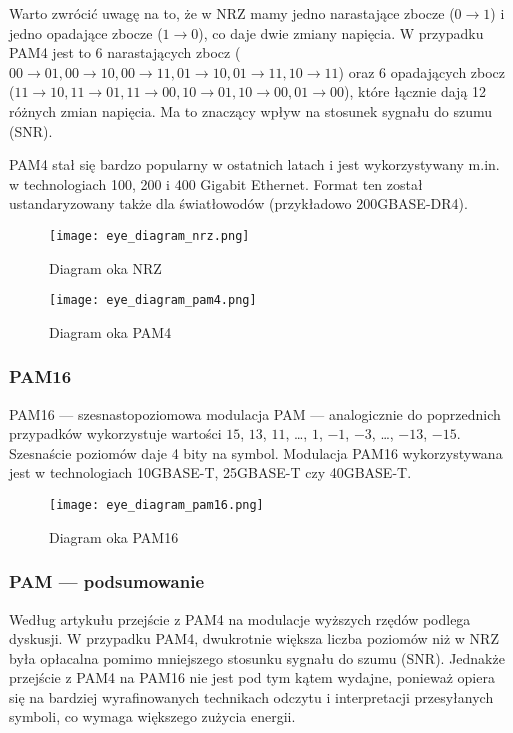 Warto zwrócić uwagę na to, że w NRZ mamy jedno narastające zbocze ($0 \rightarrow 1$) i jedno opadające zbocze ($1 \rightarrow 0$), co daje dwie zmiany napięcia. W przypadku PAM4 jest to 6 narastających zbocz
($00 \rightarrow 01, 00 \rightarrow 10, 00 \rightarrow 11, 01 \rightarrow 10, 01 \rightarrow 11, 10 \rightarrow 11$) oraz 6 opadających zbocz
($11 \rightarrow 10, 11 \rightarrow 01, 11 \rightarrow 00, 10 \rightarrow 01, 10 \rightarrow 00, 01 \rightarrow 00$), które łącznie dają 12 różnych zmian napięcia.
Ma to znaczący wpływ na stosunek sygnału do szumu (SNR).

PAM4 stał się bardzo popularny w ostatnich latach i jest wykorzystywany m.in. w technologiach 100, 200 i 400 Gigabit Ethernet. Format ten został ustandaryzowany
także dla światłowodów (przykładowo 200GBASE-DR4).

\begin{figure}[ht]
    \centering
    \texttt{[image: eye\_diagram\_nrz.png]}
    \caption{Diagram oka NRZ}
    \label{fig:diagram_oka_nrz}
\end{figure}

\begin{figure}[ht]
    \centering
    \texttt{[image: eye\_diagram\_pam4.png]}
    \caption{Diagram oka PAM4}
    \label{fig:diagram_oka_pam4}
\end{figure}

\subsubsection{PAM16}

PAM16 --- szesnastopoziomowa modulacja PAM --- analogicznie do poprzednich przypadków wykorzystuje wartości $15$, $13$, $11$, \dots , $1$, $-1$, $-3$, \dots , $-13$, $-15$. Szesnaście poziomów daje 4 bity na symbol.
Modulacja PAM16 wykorzystywana jest w technologiach 10GBASE-T, 25GBASE-T czy 40GBASE-T.

\begin{figure}[ht]
    \centering
    \texttt{[image: eye\_diagram\_pam16.png]}
    \caption{Diagram oka PAM16}
    \label{fig:diagram_oka_pam16}
\end{figure}

\subsubsection{PAM --- podsumowanie}

Według artykułu \cite{Higher-order-modulation} przejście z PAM4 na modulacje wyższych rzędów podlega dyskusji. W przypadku PAM4, dwukrotnie większa liczba
poziomów niż w NRZ była opłacalna pomimo mniejszego stosunku sygnału do szumu (SNR). Jednakże przejście z PAM4 na PAM16 nie jest pod tym kątem wydajne, ponieważ
opiera się na bardziej wyrafinowanych technikach odczytu i interpretacji przesyłanych symboli, co wymaga większego zużycia energii.

